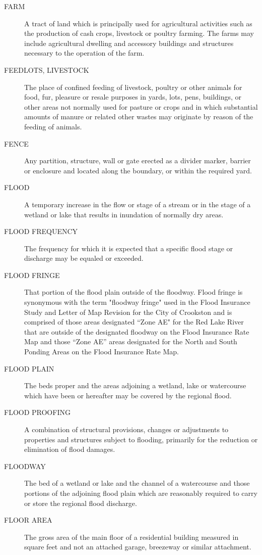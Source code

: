 \begin{description}
    \item[FARM] A tract of land which is principally used for agricultural activities such as the production of cash crops, livestock or poultry farming.  The farms may include agricultural dwelling and accessory buildings and structures necessary to the operation of the farm.
    \item[FEEDLOTS, LIVESTOCK] The place of confined feeding of livestock, poultry or other animals for food, fur, pleasure or resale purposes in yards, lots, pens, buildings, or other areas not normally used for pasture or crops and in which substantial amounts of manure or related other wastes may originate by reason of the feeding of animals.
    \item[FENCE] Any partition, structure, wall or gate erected as a divider marker, barrier or enclosure and located along the boundary, or within the required yard.
    \item[FLOOD] A temporary increase in the flow or stage of a stream or in the stage of a wetland or lake that results in inundation of normally dry areas.
    \item[FLOOD FREQUENCY] The frequency for which it is expected that a specific flood stage or discharge may be equaled or exceeded.
    \item[FLOOD FRINGE] That portion of the flood plain outside of the floodway. Flood fringe is synonymous with the term "floodway fringe" used in the Flood Insurance Study and Letter of Map Revision for the City of Crookston and is comprised of those areas designated “Zone AE" for the Red Lake River that are outside of the designated floodway on the Flood Insurance Rate Map and those “Zone AE” areas designated for the North and South Ponding Areas on the Flood Insurance Rate Map.
    \item[FLOOD PLAIN] The beds proper and the areas adjoining a wetland, lake or watercourse which have been or hereafter may be covered by the regional flood.
    \item[FLOOD PROOFING] A combination of structural provisions, changes or adjustments to properties and structures subject to flooding, primarily for the reduction or elimination of flood damages.
    \item[FLOODWAY] The bed of a wetland or lake and the channel of a watercourse and those portions of the adjoining flood plain which are reasonably required to carry or store the regional flood discharge.
    \item[FLOOR AREA] The gross area of the main floor of a residential building measured in square feet and not an attached garage, breezeway or similar attachment.

\end{description}
